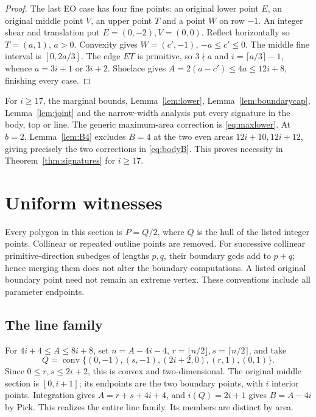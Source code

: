 \documentclass[11pt]{article}
\newcommand{\conv}{\operatorname{conv}}
\begin{document}
\begin{proof}
The last EO case has four fine points: an original lower point \(E\),
an original middle point \(V\), an upper point \(T\) and a point \(W\)
on row \(-1\). An integer shear and translation put \(E=(0,-2),V=(0,0)\).
Reflect horizontally so \(T=(a,1)\), \(a>0\).
Convexity gives \(W=(c',-1)\), \(-a\le c'\le0\).
The middle fine interval is \([0,2a/3]\). The edge \(ET\) is primitive,
so \(3\nmid a\) and \(i=\lceil a/3\rceil-1\), whence
\(a=3i+1\) or \(3i+2\). Shoelace gives
\(A=2(a-c')\le4a\le12i+8\), finishing every case.
\end{proof}

For \(i\ge17\), the marginal bounds, Lemma~\ref{lem:lower},
Lemma~\ref{lem:boundarycap}, Lemma~\ref{lem:joint} and the narrow-width
analysis put every signature in the body, top or line.
The generic maximum-area correction is \eqref{eq:maxlower}.
At \(b=2\), Lemma~\ref{lem:B4} excludes \(B=4\) at the two even areas
\(12i+10,12i+12\), giving precisely the two corrections in \eqref{eq:bodyB}.
This proves necessity in Theorem~\ref{thm:signatures} for \(i\ge17\).

\section{Uniform witnesses}\label{sec:witnesses}
Every polygon in this section is \(P=Q/2\), where \(Q\) is the hull of
the listed integer points. Collinear or repeated outline points are removed.
For successive collinear primitive-direction subedges of lengths \(p,q\),
their boundary gcds add to \(p+q\); hence merging them does not alter the
boundary computations. A listed original boundary point need not remain
an extreme vertex. These conventions include all parameter endpoints.

\subsection{The line family}
For \(4i+4\le A\le8i+8\), set \(n=A-4i-4\),
\(r=\lfloor n/2\rfloor,s=\lceil n/2\rceil\), and take
\[
 Q=\conv\{(0,-1),(s,-1),(2i+2,0),(r,1),(0,1)\}.
\]
Since \(0\le r,s\le2i+2\), this is convex and two-dimensional.
The original middle section is \([0,i+1]\); its endpoints are the two
boundary points, with \(i\) interior points. Integration gives
\(A=r+s+4i+4\), and \(i(Q)=2i+1\) gives \(B=A-4i\) by Pick.
This realizes the entire line family. Its members are distinct by area.
\end{document}
